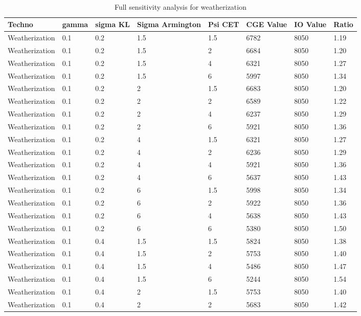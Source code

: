 \begin{table}
	\small
		\centering
		\caption{Full sensitivity analysis for weatherization}
		\
		\begin{tabular}{llllllll}
		\toprule
		Techno & gamma & sigma KL & Sigma Armington & Psi CET & CGE Value & IO Value & Ratio \\
		\midrule
		Weatherization & 0.1 & 0.2 & 1.5 & 1.5 & 6782 & 8050 & 1.19 \\
		Weatherization & 0.1 & 0.2 & 1.5 & 2 & 6684 & 8050 & 1.20 \\
		Weatherization & 0.1 & 0.2 & 1.5 & 4 & 6321 & 8050 & 1.27 \\
		Weatherization & 0.1 & 0.2 & 1.5 & 6 & 5997 & 8050 & 1.34 \\
		Weatherization & 0.1 & 0.2 & 2 & 1.5 & 6683 & 8050 & 1.20 \\
		Weatherization & 0.1 & 0.2 & 2 & 2 & 6589 & 8050 & 1.22 \\
		Weatherization & 0.1 & 0.2 & 2 & 4 & 6237 & 8050 & 1.29 \\
		Weatherization & 0.1 & 0.2 & 2 & 6 & 5921 & 8050 & 1.36 \\
		Weatherization & 0.1 & 0.2 & 4 & 1.5 & 6321 & 8050 & 1.27 \\
		Weatherization & 0.1 & 0.2 & 4 & 2 & 6236 & 8050 & 1.29 \\
		Weatherization & 0.1 & 0.2 & 4 & 4 & 5921 & 8050 & 1.36 \\
		Weatherization & 0.1 & 0.2 & 4 & 6 & 5637 & 8050 & 1.43 \\
		Weatherization & 0.1 & 0.2 & 6 & 1.5 & 5998 & 8050 & 1.34 \\
		Weatherization & 0.1 & 0.2 & 6 & 2 & 5922 & 8050 & 1.36 \\
		Weatherization & 0.1 & 0.2 & 6 & 4 & 5638 & 8050 & 1.43 \\
		Weatherization & 0.1 & 0.2 & 6 & 6 & 5380 & 8050 & 1.50 \\
		Weatherization & 0.1 & 0.4 & 1.5 & 1.5 & 5824 & 8050 & 1.38 \\
		Weatherization & 0.1 & 0.4 & 1.5 & 2 & 5753 & 8050 & 1.40 \\
		Weatherization & 0.1 & 0.4 & 1.5 & 4 & 5486 & 8050 & 1.47 \\
		Weatherization & 0.1 & 0.4 & 1.5 & 6 & 5244 & 8050 & 1.54 \\
		Weatherization & 0.1 & 0.4 & 2 & 1.5 & 5753 & 8050 & 1.40 \\
		Weatherization & 0.1 & 0.4 & 2 & 2 & 5683 & 8050 & 1.42 \\

\end{tabular}
\end{table}
